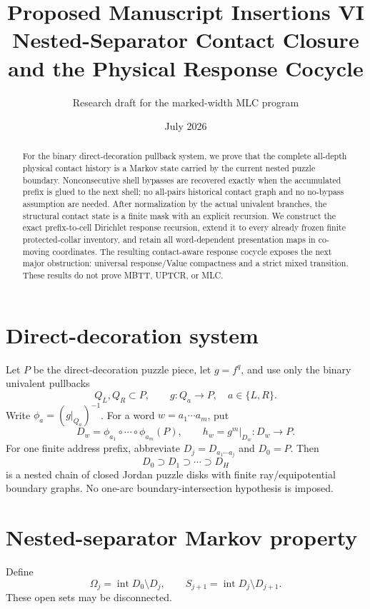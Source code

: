 \documentclass[11pt]{article}
\title{Proposed Manuscript Insertions VI\\
Nested-Separator Contact Closure and the Physical Response Cocycle}
\author{Research draft for the marked-width MLC program}
\date{July 2026}
\theoremstyle{definition}
\theoremstyle{remark}
\newcommand{\Int}{\operatorname{int}}
\begin{document}
\maketitle

\begin{abstract}
For the binary direct-decoration pullback system, we prove that the complete
all-depth physical contact history is a Markov state carried by the current
nested puzzle boundary.  Nonconsecutive shell bypasses are recovered exactly
when the accumulated prefix is glued to the next shell; no all-pairs historical
contact graph and no no-bypass assumption are needed.  After normalization by
the actual univalent branches, the structural contact state is a finite mask
with an explicit recursion.  We construct the exact prefix-to-cell Dirichlet
response recursion, extend it to every already frozen finite protected-collar
inventory, and retain all word-dependent presentation maps in co-moving
coordinates.  The resulting contact-aware response cocycle exposes the next
major obstruction: universal response/Value compactness and a strict mixed
transition.  These results do not prove MBTT, UPTCR, or MLC.
\end{abstract}

\section{Direct-decoration system}
Let $P$ be the direct-decoration puzzle piece, let $g=f^q$, and use only the
binary univalent pullbacks
\[
 Q_L,Q_R\subset P,\qquad g:Q_a\to P,
 \quad a\in\{L,R\}.
\]
Write $\phi_a=(g|_{Q_a})^{-1}$.  For a word
$w=a_1\cdots a_m$, put
\[
 D_w=\phi_{a_1}\circ\cdots\circ\phi_{a_m}(P),
 \qquad h_w=g^m|_{D_w}:D_w\to P.
\]
For one finite address prefix, abbreviate $D_j=D_{a_1\cdots a_j}$ and
$D_0=P$.  Then
\[
 D_0\supset D_1\supset\cdots\supset D_H
 \tag{1.1}
\]
is a nested chain of closed Jordan puzzle disks with finite
ray/equipotential boundary graphs.  No one-arc boundary-intersection hypothesis
is imposed.

\section{Nested-separator Markov property}
Define
\[
 \Omega_j=\Int D_0\setminus D_j,
 \qquad
 S_{j+1}=\Int D_j\setminus D_{j+1}.
 \tag{2.1}
\]
These open sets may be disconnected.
\end{document}
